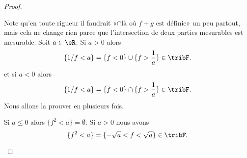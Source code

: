 \begin{proof}
\begin{subproof}
		Note qu'en toute rigueur il faudrait  «\( \cap\text{là où } f+g\text{ est définie}\)» un peu partout, mais cela ne change rien parce que l'intersection de deux parties mesurables est mesurable.
		\spitem[Mesurabilité de \( 1/f\)]
		Soit \( a\in \eR\). Si \( a>0\) alors
		\begin{equation}
			\{ 1/f<a \}=\{ f<0 \}\cup\{ f>\frac{1}{ a } \}\in\tribF.
		\end{equation}
		et si \( a<0\) alors
		\begin{equation}
			\{ 1/f<a \}=\{ f<0 \}\cap\{ f>\frac{1}{ a } \}\in\tribF.
		\end{equation}
		\spitem[Mesurabilité de \( fg\)]
		Nous allons la prouver en plusieurs fois.
		\begin{subproof}
			Si \( a\leq 0\) alors \( \{ f^2<a \}=\emptyset\). Si \( a>0\) nous avons
			\begin{equation}
				\{ f^2<a \}=\{ -\sqrt{a}<f<\sqrt{a} \}\in\tribF.
			\end{equation}


\end{subproof}
\end{subproof}
\end{proof}
